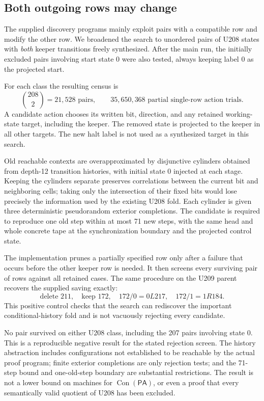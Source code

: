 \documentclass[11pt,a4paper]{article}
\newcommand{\PA}{\mathsf{PA}}
\newcommand{\Con}{\operatorname{Con}}
\begin{document}
\subsection{Both outgoing rows may change}

The supplied discovery programs mainly exploit pairs with a compatible
row and modify the other row. We broadened the search to unordered pairs
of U208 states with \emph{both} keeper transitions freely synthesized.
After the main run, the initially excluded pairs involving start state 0
were also tested, always keeping label 0 as the projected start.

For each class the resulting census is
\[
\binom{208}{2}=21{,}528\text{ pairs},\qquad
35{,}650{,}368\text{ partial single-row action trials}.
\]
A candidate action chooses its written bit, direction, and any retained
working-state target, including the keeper. The removed state is projected
to the keeper in all other targets. The new halt label is not used as a
synthesized target in this search.

Old reachable contexts are overapproximated by disjunctive cylinders
obtained from depth-12 transition histories, with initial state 0 injected
at each stage. Keeping the cylinders separate preserves correlations
between the current bit and neighboring cells; taking only the intersection
of their fixed bits would lose precisely the information used by the
existing U208 fold. Each cylinder is given three deterministic pseudorandom
exterior completions. The candidate is required to reproduce one old step
within at most 71 new steps, with the same head and whole concrete tape at
the synchronization boundary and the projected control state.

The implementation prunes a partially specified row only after a failure
that occurs before the other keeper row is needed. It then screens every
surviving pair of rows against all retained cases. The same procedure on
the U209 parent recovers the supplied saving exactly:
\[
\text{delete }211,\quad\text{keep }172,\quad
172/0=0L217,\quad172/1=1R184.
\]
This positive control checks that the search can rediscover the important
conditional-history fold and is not vacuously rejecting every candidate.

No pair survived on either U208 class, including the 207 pairs involving
state 0. This is a reproducible negative result for the stated rejection
screen. The history abstraction includes configurations not established to
be reachable by the actual proof program; finite exterior completions are
only rejection tests; and the 71-step bound and one-old-step boundary are
substantial restrictions. The result is not a lower bound on machines for
$\Con(\PA)$, or even a proof that every semantically valid quotient of U208
has been excluded.
\end{document}
